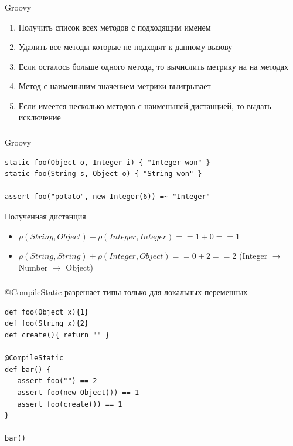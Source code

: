 \documentclass[t]{beamer}  %
\begin{document}
	
\begin{frame}
	\frametitle{\insertsection} 
  	\framesubtitle{\insertsubsection}
    \begin{block}{Groovy}
		\begin{enumerate}
			\item  Получить список всех методов с подходящим именем
			\item  Удалить все методы которые не подходят к данному вызову
			\item  Если осталось больше одного метода, то вычислить метрику на на методах
			\item  Метод с наименьшим значением метрики выигрывает
			\item  Если имеется несколько методов с наименьшей дистанцией, то выдать исключение
		\end{enumerate}
	\end{block}
\end{frame}


\begin{frame}[fragile]
	\frametitle{\insertsection} 
  	\framesubtitle{\insertsubsection}
    \begin{block}{Groovy}
		\begin{verbatim}
static foo(Object o, Integer i) { "Integer won" }
static foo(String s, Object o) { "String won" }

assert foo("potato", new Integer(6)) =~ "Integer"
		\end{verbatim}
	\end{block}
	\begin{block}{Полученная дистанция}
    \begin{itemize}
	    \item $\rho(String, Object) + \rho(Integer, Integer) == 1 + 0 == 1$
	    \item $\rho(String, String) + \rho(Integer, Object) == 0 + 2 == 2$ (Integer $\rightarrow$ Number $\rightarrow$ Object)
	\end{itemize}
    \end{block}
\end{frame}

\begin{frame}[fragile]
	\frametitle{\insertsection} 
  	\framesubtitle{\insertsubsection}
    \begin{block}{@CompileStatic разрешает типы только для локальных переменных}
	    \begin{verbatim}
def foo(Object x){1} 
def foo(String x){2} 
def create(){ return "" } 
 
@CompileStatic 
def bar() { 
   assert foo("") == 2 
   assert foo(new Object()) == 1 
   assert foo(create()) == 1 
} 
 
bar()
		\end{verbatim}
    \end{block}
\end{frame}
\end{document}
